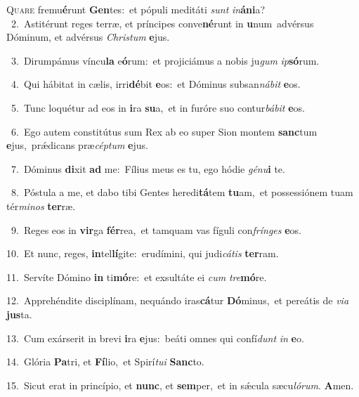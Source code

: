 \lettrine{\initial\textcolor{\initialcolor}{Q}}{uare} fremu\-\textbf{é}\-runt \textbf{Gen}\-tes:~\star et pópuli meditáti \textit{sunt} \textit{in}\-\textbf{á}\textbf{ni}a?\\
{\numbfont\textcolor{\numbcolor}{~2.}}~Astitérunt reges terræ, et príncipes conve\-\textbf{né}\-runt in \textbf{u}\-num~\star advérsus Dóminum, et advérsus \textit{Chris}\-\textit{tum} \textbf{e}\-jus.\par
{\numbfont\textcolor{\numbcolor}{~3.}}~Dirumpámus víncu\textbf{la} e\-\textbf{ó}\-rum:~\star et projiciámus a nobis ju\textit{gum} \textit{ip}\-\textbf{só}rum.\par
{\numbfont\textcolor{\numbcolor}{~4.}}~Qui hábitat in cælis, irri\-\textbf{dé}\-bit \textbf{e}\-os:~\star et Dóminus subsan\-\textit{ná}\-\textit{bit} \textbf{e}\-os.\par
{\numbfont\textcolor{\numbcolor}{~5.}}~Tunc loquétur ad eos in \textbf{i}\-ra \textbf{su}\-a,~\star et in furóre suo contur\-\textit{bá}\-\textit{bit} \textbf{e}\-os.\par
{\numbfont\textcolor{\numbcolor}{~6.}}~Ego autem constitútus sum Rex ab eo super Sion montem \textbf{sanc}\-tum \textbf{e}\-jus,~\star prǽdicans præ\-\textit{cép}\-\textit{tum} \textbf{e}\-jus.\par
{\numbfont\textcolor{\numbcolor}{~7.}}~Dóminus \textbf{di}\-xit \textbf{ad} me:~\star Fílius meus es tu, ego hódie \textit{gé}\-\textit{nu}\textbf{i} te.\par
{\numbfont\textcolor{\numbcolor}{~8.}}~Póstula a me, et dabo tibi Gentes heredi\-\textbf{tá}\-tem \textbf{tu}\-am,~\star et possessiónem tuam tér\-\textit{mi}\-\textit{nos} \textbf{ter}\-ræ.\par
{\numbfont\textcolor{\numbcolor}{~9.}}~Reges eos in \textbf{vir}\-ga \textbf{fér}\-rea,~\star et tamquam vas fíguli con\-\textit{frín}\-\textit{ges} \textbf{e}\-os.\par
{\numbfont\textcolor{\numbcolor}{10.}}~Et nunc, reges, \textbf{in}\-tel\-\textbf{lí}\-gite:~\star erudímini, qui judi\-\textit{cá}\-\textit{tis} \textbf{ter}\-ram.\par
{\numbfont\textcolor{\numbcolor}{11.}}~Servíte Dómino \textbf{in} ti\-\textbf{mó}\-re:~\star et exsultáte ei \textit{cum} \textit{tre}\-\textbf{mó}re.\par
{\numbfont\textcolor{\numbcolor}{12.}}~Apprehéndite disciplínam, nequándo iras\-\textbf{cá}\-tur \textbf{Dó}\-minus,~\star et pereátis de \textit{vi}\-\textit{a} \textbf{jus}\-ta.\par
{\numbfont\textcolor{\numbcolor}{13.}}~Cum exárserit in brevi \textbf{i}\-ra \textbf{e}\-jus:~\star beáti omnes qui confí\textit{dunt} \textit{in} \textbf{e}\-o.\par
{\numbfont\textcolor{\numbcolor}{14.}}~Glória \textbf{Pa}\-tri, et \textbf{Fí}\-lio,~\star et Spirí\-\textit{tu}\-\textit{i} \textbf{Sanc}\-to.\par
{\numbfont\textcolor{\numbcolor}{15.}}~Sicut erat in princípio, et \textbf{nunc}\-, et \textbf{sem}\-per,~\star et in sǽcula sæcu\-\textit{ló}\-\textit{rum}. \textbf{A}\-men.\par
